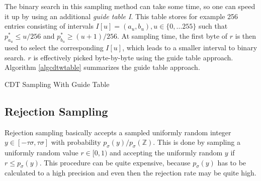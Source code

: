The binary search in this sampling method can take some time, so one can speed it up by using an additional \textit{guide table I}. This table stores for example 256 entries consisting of intervals $I[u] = (a_u, b_u), u \in \{0,...255\}$ such that $p^*_{a_{u}} \le u/256$ and $p^*_{b_{u}} \ge (u+1)/256$. At sampling time, the first byte of $r$ is then used to select the corresponding $I[u]$, which leads to a smaller interval to binary search. $r$ is effectively picked byte-by-byte using the guide table approach. Algorithm \ref{algcdtwtable} summarizes the guide table approach.
 \begin{algorithm}
 	\caption{CDT Sampling With Guide Table}
 	\label{algcdtwtable}
 	\begin{algorithmic}[1]
	 		\State
	 	\EndIf
				\State
				\Else
			\EndIf	
		\EndWhile
 	\end{algorithmic}
 \end{algorithm}
\subsection{Rejection Sampling}
Rejection sampling basically accepts a sampled uniformly random integer $y \in [-\tau\sigma, \tau\sigma]$ with probability $p_\sigma(y)/p_\sigma(\mathbb{Z})$. This is done by sampling a uniformly random value $r \in [0,1)$ and accepting the uniformly random $y$ if $r \le p_\sigma(y)$. This procedure can be quite expensive, because $p_\sigma(y)$ has to be calculated to a high precision and even then the rejection rate may be quite high.

